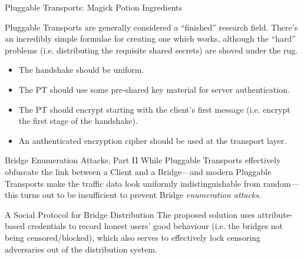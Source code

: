\documentclass[9pt,a4paper]{beamer}
\begin{document}
\begin{frame}{Pluggable Transports: Magick Potion Ingredients}

  Pluggable Transports are generally considered a ``finished'' research field.  There's an
  incredibly simple formulae for creating one which works, although the ``hard'' problems
  (i.e. distributing the requisite shared secrets) are shoved under the rug.

  \begin{itemize}
    \item<2-> The handshake should be uniform.

    \item<3-> The PT should use some pre-shared key material for server authentication.
    \item<4-> The PT should encrypt starting with the client's first message (i.e. encrypt the first
      stage of the handshake).
    \item<5-> An anthenticated encryption cipher should be used at the transport layer.
  \end{itemize}


\end{frame}


\begin{frame}{Bridge Enumeration Attacks, Part II}
  While Pluggable Transports effectively obfuscate the link between a Client and a Bridge—and modern
  Pluggable Transports make the traffic data look uniformly indistinguishable from random—this turns
  out to be insufficient to prevent Bridge \emph{enumeration attacks}.

\end{frame}


\begin{frame}{A Social Protocol for Bridge Distribution}
  The proposed solution uses attribute-based credentials to record honest users' good behaviour
  (i.e. the bridges not being censored/blocked), which also serves to effectively lock censoring
  adversaries out of the distribution system.

\end{frame}
  
\end{document}
